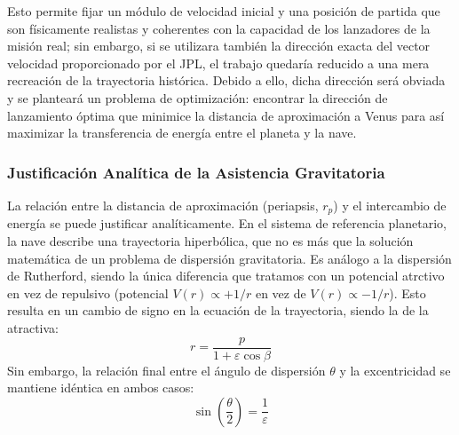 
Esto permite fijar un módulo de velocidad inicial y una posición de partida que son físicamente realistas 
y coherentes con la capacidad de los lanzadores de la misión real; sin embargo, si se utilizara 
también la dirección exacta del vector velocidad proporcionado por el JPL, el trabajo quedaría reducido a una mera 
recreación de la trayectoria histórica. 
Debido a ello, dicha dirección será obviada y se planteará un problema de optimización:
encontrar la dirección de lanzamiento óptima que minimice la distancia de aproximación a Venus para así maximizar
la transferencia de energía entre el planeta y la nave.

\subsubsection{Justificación Analítica de la Asistencia Gravitatoria}
La relación entre la distancia de aproximación (periapsis, $r_p$) y el intercambio de energía se puede justificar analíticamente. 
En el sistema de referencia planetario, la nave describe una trayectoria hiperbólica, 
que no es más que la solución matemática de un problema de dispersión gravitatoria.
Es análogo a la dispersión de Rutherford, siendo la única diferencia que tratamos con un potencial atrctivo en vez de repulsivo
(potencial $V(r) \propto +1/r$ en vez de $V(r) \propto -1/r$).
Esto resulta en un cambio de signo en la ecuación de la trayectoria, siendo la de la atractiva:
$$r = \frac{p}{1 + \varepsilon\cos \beta}$$
Sin embargo, la relación final entre el ángulo de 
dispersión $\theta$ y la excentricidad se mantiene idéntica en ambos casos:
$$\sin\left(\frac{\theta}{2}\right) = \frac{1}{\varepsilon}$$

